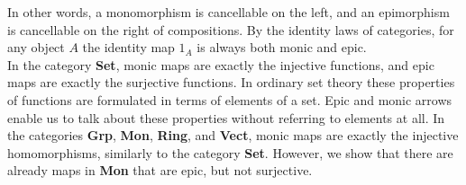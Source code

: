
In other words, a monomorphism is cancellable on the left, and an epimorphism is cancellable on the right of compositions.
By the identity laws of categories, for any object $A$ the identity map $1_A$ is always both monic and epic.\\
In the category \textbf{Set}, monic maps are exactly the injective functions, and epic maps are exactly the surjective functions.
In ordinary set theory these properties of functions are formulated in terms of elements of a set.
Epic and monic arrows enable us to talk about these properties without referring to elements at all.
In the categories \textbf{Grp}, \textbf{Mon}, \textbf{Ring}, and \textbf{Vect}, monic maps are exactly the injective homomorphisms,
similarly to the category \textbf{Set}.
However, we show that there are already maps in \textbf{Mon} that are epic, but not surjective.
